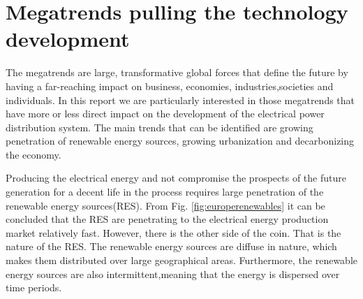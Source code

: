 \documentclass[]{scrartcl}
\begin{document}
%
%
 


\newpage
\newpage

\section{Megatrends pulling the technology development}

The megatrends are large, transformative global forces that define the future by having a far-reaching impact on business, economies, industries,societies and individuals\cite{EY2015}. In this report we are particularly interested in those megatrends that have more or less direct impact on the development of the electrical power distribution system. The main trends that can be identified are growing penetration of renewable energy sources, growing urbanization and decarbonizing the economy. 


Producing the electrical energy and not compromise the prospects of the future generation for a decent life in the process requires large penetration of the renewable energy sources(RES).  From Fig. \ref{fig:europerenewables} it can be concluded that the RES are penetrating to the electrical energy production market relatively fast. However, there is the other side of the coin. That is the nature of the RES. The renewable energy sources are diffuse in nature, which makes them distributed over large geographical areas. Furthermore, the renewable energy sources are also intermittent,meaning that the energy is dispersed over time periods. 
\end{document}
